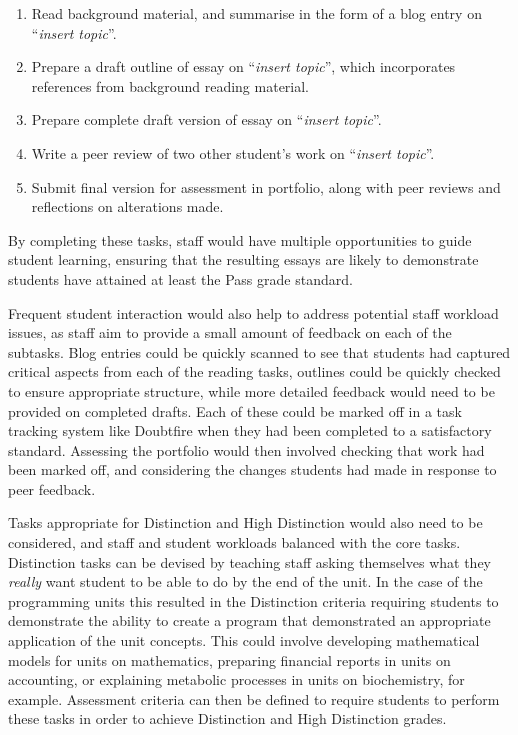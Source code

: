 \begin{enumerate}
	\item Read background material, and summarise in the form of a blog entry on ``\emph{insert topic}''.
	\item Prepare a draft outline of essay on ``\emph{insert topic}'', which incorporates references from background reading material.
	\item Prepare complete draft version of essay on ``\emph{insert topic}''.
	\item Write a peer review of two other student's work on ``\emph{insert topic}''. 
	\item Submit final version for assessment in portfolio, along with peer reviews and reflections on alterations made.
\end{enumerate}

By completing these tasks, staff would have multiple opportunities to guide student learning, ensuring that the resulting essays are likely to demonstrate students have attained at least the Pass grade standard. 

Frequent student interaction would also help to address potential staff workload issues, as staff aim to provide a small amount of feedback on each of the subtasks. Blog entries could be quickly scanned to see that students had captured critical aspects from each of the reading tasks, outlines could be quickly checked to ensure appropriate structure, while more detailed feedback would need to be provided on completed drafts. Each of these could be marked off in a task tracking system like Doubtfire when they had been completed to a satisfactory standard. Assessing the portfolio would then involved checking that work had been marked off, and considering the changes students had made in response to peer feedback.

Tasks appropriate for Distinction and High Distinction would also need to be considered, and staff and student workloads balanced with the core tasks. Distinction tasks can be devised by teaching staff asking themselves what they \emph{really} want student to be able to do by the end of the unit. In the case of the programming units this resulted in the Distinction criteria requiring students to demonstrate the ability to create a program that demonstrated an appropriate application of the unit concepts. This could involve developing mathematical models for units on mathematics, preparing financial reports in units on accounting, or explaining metabolic processes in units on biochemistry, for example. Assessment criteria can then be defined to require students to perform these tasks in order to achieve Distinction and High Distinction grades.


